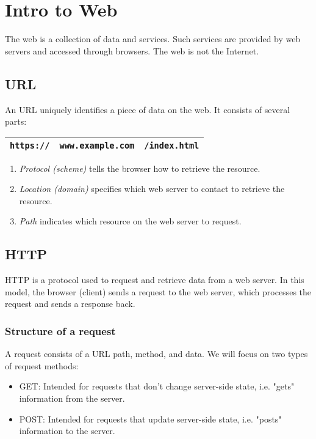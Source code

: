 \chapter{Intro to Web}

The web is a collection of data and services. Such services are provided by web servers and accessed through browsers. The web is not the Internet.

\section{URL}
An URL uniquely identifies a piece of data on the web. It consists of several parts:

\medskip
\begin{tabular}{|c|c|c|}
    \hline
    \texttt{https://} &
    \texttt{www.example.com} &
    \texttt{/index.html} \\
    \hline
\end{tabular}

\begin{enumerate}
    \item \emph{Protocol (scheme)} tells the browser how to retrieve the resource.
    \item \emph{Location (domain)} specifies which web server to contact to retrieve the resource.
    \item \emph{Path} indicates which resource on the web server to request.
\end{enumerate}

\section{HTTP}
HTTP is a protocol used to request and retrieve data from a web server. In this model, the browser (client) sends a request to the web server, which processes the request and sends a response back.

\subsection{Structure of a request}
A request consists of a URL path, method, and data. We will focus on two types of request methods:
\begin{itemize}
    \item GET: Intended for requests that don't change server-side state, i.e. "gets" information from the server.
    \item POST: Intended for requests that update server-side state, i.e. "posts" information to the server.
\end{itemize}

